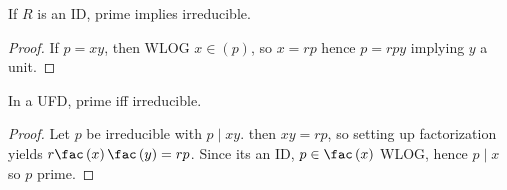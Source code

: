 \begin{theorem}
	If \(R\) is an ID, prime implies irreducible.
\end{theorem}
\begin{proof}
	If \(p = xy\), then WLOG \(x \in \left( p \right) \), so \(x = rp\) hence \(p = rpy\) implying \(y\) a unit.
\end{proof}
\begin{theorem}
	In a UFD, prime iff irreducible.
\end{theorem}
\begin{proof}
Let \(p\) be irreducible with \(p \mid xy\). then \(xy = rp\), so setting up factorization yields \(r\fac\left( x \right) \fac\left( y \right) = rp \). Since its an ID, \(p \in \fac\left( x \right) \) WLOG, hence \(p \mid x\) so \(p\) prime.
\end{proof}
